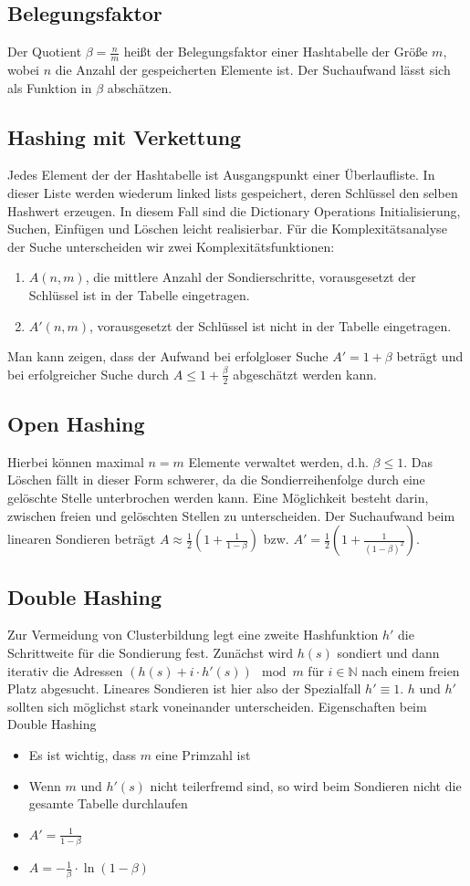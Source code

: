 \documentclass[a4paper, 12pt]{article}
\begin{document}
	\subsection{Belegungsfaktor}
	Der Quotient $\beta = \frac{n}{m}$ heißt der Belegungsfaktor einer Hashtabelle der Größe $m$, wobei $n$ die Anzahl der gespeicherten Elemente ist. Der Suchaufwand lässt sich als Funktion in $\beta$ abschätzen.
	\subsection{Hashing mit Verkettung}
	Jedes Element der der Hashtabelle ist Ausgangspunkt einer Überlaufliste. In dieser Liste werden wiederum linked lists gespeichert, deren Schlüssel den selben Hashwert erzeugen. In diesem Fall sind die Dictionary Operations Initialisierung, Suchen, Einfügen und Löschen leicht realisierbar. Für die Komplexitätsanalyse der Suche unterscheiden wir zwei Komplexitätsfunktionen: \begin{enumerate}
		\item $A(n,m)$, die mittlere Anzahl der Sondierschritte, vorausgesetzt der Schlüssel ist in der Tabelle eingetragen.
		\item $A'(n,m)$, vorausgesetzt der Schlüssel ist nicht in der Tabelle eingetragen. 
	\end{enumerate}
	Man kann zeigen, dass der Aufwand bei erfolgloser Suche $A' = 1+\beta$ beträgt und bei erfolgreicher Suche durch $A \leq 1+\frac{\beta}{2}$ abgeschätzt werden kann.
	\subsection{Open Hashing}
	Hierbei können maximal $n=m$ Elemente verwaltet werden, d.h. $\beta \leq 1$. Das Löschen fällt in dieser Form schwerer, da die Sondierreihenfolge durch eine gelöschte Stelle unterbrochen werden kann. Eine Möglichkeit besteht darin, zwischen freien und gelöschten Stellen zu unterscheiden. Der Suchaufwand beim linearen Sondieren beträgt $A \approx \frac{1}{2} \left(1+ \frac{1}{1-\beta} \right)$ bzw. $A' = \frac{1}{2} \left(1+\frac{1}{(1-\beta)^2}\right)$. 
	\subsection{Double Hashing}
	Zur Vermeidung von Clusterbildung legt eine zweite Hashfunktion $h'$ die Schrittweite für die Sondierung fest. Zunächst wird $h(s)$ sondiert und dann iterativ die Adressen $(h(s) + i\cdot h'(s)) \mod m$ für $i \in \mathbb{N}$ nach einem freien Platz abgesucht. Lineares Sondieren ist hier also der Spezialfall $h' \equiv 1$. $h$ und $h'$ sollten sich möglichst stark voneinander unterscheiden. Eigenschaften beim Double Hashing \begin{itemize}
		\item Es ist wichtig, dass $m$ eine Primzahl ist
		\item Wenn $m$ und $h'(s)$ nicht teilerfremd sind, so wird beim Sondieren nicht die gesamte Tabelle durchlaufen
		\item $A' = \frac{1}{1-\beta}$
		\item $A = -\frac{1}{\beta} \cdot \ln(1-\beta)$
	\end{itemize}
\end{document}
